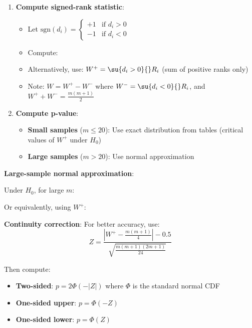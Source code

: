 \begin{enumerate}
    \item \textbf{Compute signed-rank statistic}:
        \begin{itemize}
            \item Let $\text{sgn}(d_i) = \begin{cases} +1 & \text{if } d_i > 0 \\ -1 & \text{if } d_i < 0 \end{cases}$
            \item Compute: 
            \item Alternatively, use: $W^+ = \su{d_i > 0}{}R_i$ (sum of positive ranks only)
            \item Note: $W = W^+ - W^-$ where $W^- = \su{d_i < 0}{}R_i$, and $W^+ + W^- = \frac{m(m+1)}{2}$
        \end{itemize}

    \item \textbf{Compute p-value}:
        \begin{itemize}
            \item \textbf{Small samples} ($m \leq 20$): Use exact distribution from tables
                (critical values of $W^+$ under $H_0$)
            \item \textbf{Large samples} ($m > 20$): Use normal approximation
        \end{itemize}
\end{enumerate}

\textbf{Large-sample normal approximation}:

Under $H_0$, for large $m$:
\begin{center}
\end{center}

Or equivalently, using $W^+$:
\begin{center}
\end{center}

\textbf{Continuity correction}: For better accuracy, use:
$$Z = \dfrac{|W^+ - \frac{m(m+1)}{4}| - 0.5}{\sqrt{\frac{m(m+1)(2m+1)}{24}}}$$

Then compute:
\begin{itemize}
    \item \textbf{Two-sided}: $p = 2\Phi(-|Z|)$ where $\Phi$ is the standard normal CDF
    \item \textbf{One-sided upper}: $p = \Phi(-Z)$
    \item \textbf{One-sided lower}: $p = \Phi(Z)$
\end{itemize}

